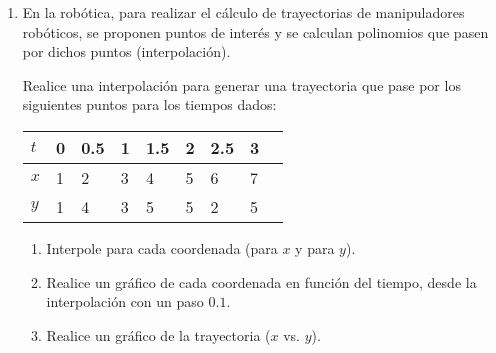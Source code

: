 \documentclass[a4paper,11pt]{article}
\theoremstyle{mytheor}
\begin{document}
\begin{enumerate}
\item En la robótica, para realizar el cálculo de trayectorias de manipuladores robóticos, se proponen puntos de interés y se calculan polinomios que pasen por dichos puntos (interpolación).

Realice una interpolación para generar una trayectoria que pase por los siguientes puntos para los tiempos dados:

      \begin{table}[h!]
        \centering
        \begin{tabular}{l|llllllll}
        \hline
        $t$ & 0    & 0.5  & 1    & 1.5  & 2  & 2.5  & 3   \\ \hline
        $x$ & 1    & 2    & 3    & 4    & 5  & 6    & 7   \\ \hline
		$y$ & 1    & 4    & 3    & 5    & 5  & 2    & 5   \\ \hline  
        \end{tabular}
        \end{table}

     \begin{enumerate}
            \item Interpole para cada coordenada (para $x$ y para $y$).
            \item Realice un gráfico de cada coordenada en función del tiempo, desde la interpolación con un paso $0.1$.
            \item Realice un gráfico de la trayectoria ($x$ vs. $y$).
        \end{enumerate}


\end{enumerate}
\end{document}
